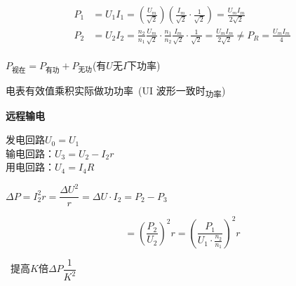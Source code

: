 \begin{align*}
P_1&=U_1I_1=\left(\frac{U_m}{\sqrt2}\right)\left(\frac{I_m}{\sqrt2}\cdot\frac{1}{\sqrt2}\right)=\frac{U_mI_m}{2\sqrt2}\\
P_2&=U_2I_2=\frac{n_2}{n_1}\frac{U_m}{\sqrt2}\cdot\frac{n_1}{n_2}\frac{I_m}{\sqrt2}\cdot\frac{1}{\sqrt2}=\frac{U_mI_m}{2\sqrt2}\neq P_R=\frac{U_mI_m}{4}
\end{align*}

\noindent $P_{\text{视在}}=P_{\text{有功}}+P_{\text{无功}}$\quad (有$U$无$I$下\textsuperscript{}功率)%

\noindent 电表有效值乘积\quad 实际做功功率\ (UI 波形一致时\textsubscript{功率})%

\noindent {}
\textbf{远程输电}

\noindent 发电回路\quad $U_0=U_1$\\
输电回路：$U_3=U_2-I_2r$\\
用电回路：$U_4=I_4R$

\noindent {}%
\quad $\Delta P=I_2^2r=\dfrac{\Delta U^2}{r}=\Delta U\cdot I_2=P_2-P_3$

\[
=\left(\frac{P_2}{U_2}\right)^2r=\left(\frac{P_1}{U_1\cdot\frac{n_2}{n_1}}\right)^2r
\]%

\noindent {}\ 提高$K$倍\quad $\Delta P$$\dfrac{1}{K^2}$%

